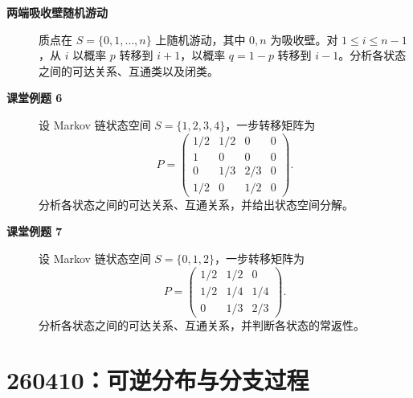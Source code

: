 \documentclass[12pt,a4paper,openany]{ctexrep}
\theoremstyle{definition}
\begin{document}
\begin{description}
	\item[\textbf{两端吸收壁随机游动}] 质点在 $S=\{0,1,\dots,n\}$ 上随机游动，其中 $0,n$ 为吸收壁。对 $1\le i\le n-1$，从 $i$ 以概率 $p$ 转移到 $i+1$，以概率 $q=1-p$ 转移到 $i-1$。分析各状态之间的可达关系、互通类以及闭类。
	\item[\textbf{课堂例题 6}] 设 Markov 链状态空间 $S=\{1,2,3,4\}$，一步转移矩阵为
	\[
	P=
	\begin{pmatrix}
	1/2&1/2&0&0\\
	1&0&0&0\\
	0&1/3&2/3&0\\
	1/2&0&1/2&0
	\end{pmatrix}.
	\]
	分析各状态之间的可达关系、互通关系，并给出状态空间分解。
	\item[\textbf{课堂例题 7}] 设 Markov 链状态空间 $S=\{0,1,2\}$，一步转移矩阵为
	\[
	P=
	\begin{pmatrix}
	1/2&1/2&0\\
	1/2&1/4&1/4\\
	0&1/3&2/3
	\end{pmatrix}.
	\]
	分析各状态之间的可达关系、互通关系，并判断各状态的常返性。
\end{description}

\section{260410：可逆分布与分支过程}
\end{document}
